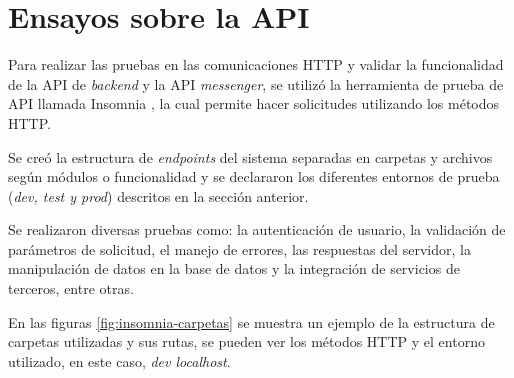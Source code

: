 \section{Ensayos sobre la API}
\label{sec:ensayos-api}

Para realizar las pruebas en las comunicaciones HTTP y validar la funcionalidad de la API de \textit{backend} y la API \textit{messenger}, se utilizó la herramienta de prueba de API llamada Insomnia \cite{insomnia}, la cual permite hacer solicitudes utilizando los métodos HTTP.

Se creó la estructura de \textit{endpoints} del sistema separadas en carpetas y archivos según módulos o funcionalidad y se declararon los diferentes entornos de prueba (\textit{dev, test y prod}) descritos en la sección anterior. 

Se realizaron diversas pruebas como: la autenticación de usuario, la validación de parámetros de solicitud, el manejo de errores, las respuestas del servidor, la manipulación de datos en la base de datos y la integración de servicios de terceros, entre otras.

En las figuras \ref{fig:insomnia-carpetas} se muestra un ejemplo de la estructura de carpetas utilizadas y sus rutas, se pueden ver los métodos HTTP y el entorno utilizado, en este caso, \textit{dev localhost}.

